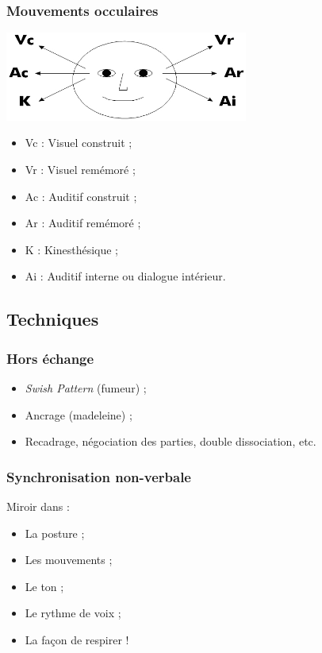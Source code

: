\documentclass{beamer}
\begin{document}
\begin{frame}[t]\frametitle{Mouvements occulaires}
	\begin{center}
		\includegraphics[width=8cm]{yeux.jpg}
	\end{center}
	\begin{itemize}
		\item<+-> Vc : Visuel construit ;
		\item<+-> Vr : Visuel remémoré ;
		\item<+-> Ac : Auditif construit ;
		\item<+-> Ar : Auditif remémoré ;
		\item<+-> K : Kinesthésique ;
		\item<+-> Ai : Auditif interne ou dialogue intérieur.
	\end{itemize}
\end{frame}

\subsection{Techniques}

\begin{frame}[t]\frametitle{Hors échange}
	\begin{itemize}
		\item \emph{Swish Pattern} (fumeur) ;
		\item Ancrage (madeleine) ;
		\item Recadrage, négociation des parties, double dissociation, etc.
	\end{itemize}
\end{frame}

\begin{frame}[t]\frametitle{Synchronisation non-verbale}
	Miroir dans :
	\begin{itemize}
		\item La posture ;
		\item Les mouvements ;
		\item Le ton ;
		\item Le rythme de voix ;
		\item La façon de respirer !
	\end{itemize}
\end{frame}
\end{document}
